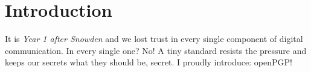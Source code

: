\chapter{Introduction}

It is \textit{Year 1 after Snowden} and we lost trust in every single component of digital communication. In every single one? No! A tiny standard resists the pressure and keeps our secrets what they should be, secret. I proudly introduce: openPGP!

%
%
%
%
%
%
%
%
%
